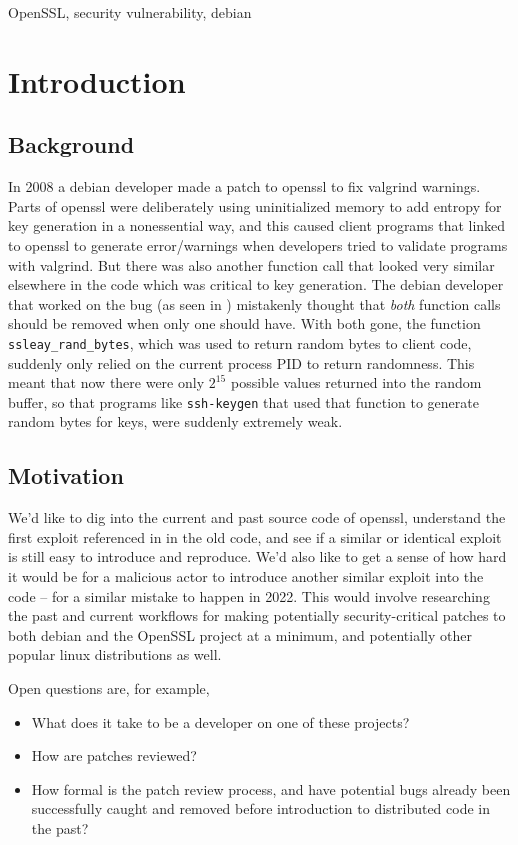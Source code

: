 \documentclass[conference]{IEEEtran}
\begin{document}
\begin{IEEEkeywords}
OpenSSL, security vulnerability, debian
\end{IEEEkeywords}

\section{Introduction}
\subsection{Background}
In 2008 a debian developer made a patch to openssl to fix valgrind
warnings\cite{2}\cite{3}. Parts of openssl were deliberately using
uninitialized memory to add entropy for key generation in a
nonessential way, and this caused client programs that linked to
openssl to generate error/warnings when developers tried to validate
programs with valgrind. But there was also another function call that
looked very similar elsewhere in the code which was critical to key
generation. The debian developer that worked on the bug (as seen in
\cite{2}) mistakenly thought that \emph{both} function calls should be
removed when only one should have. With both gone, the function
\verb|ssleay_rand_bytes|, which was used to return random bytes to
client code, suddenly only relied on the current process PID to return
randomness. This meant that now there were only $2^{15}$ possible
values returned into the random buffer, so that programs like
\verb|ssh-keygen| that used that function to generate random bytes for
keys, were suddenly extremely weak.

\subsection{Motivation}
We'd like to dig into the current and past source code of openssl,
understand the first exploit referenced in \cite{1} in the old code,
and see if a similar or identical exploit is still easy to introduce
and reproduce. We'd also like to get a sense of how hard it would be
for a malicious actor to introduce another similar exploit into the
code -- for a similar mistake to happen in 2022. This would involve
researching the past and current workflows for making potentially
security-critical patches to both debian and the OpenSSL project at a
minimum, and potentially other popular linux distributions as well.

Open questions are, for example,

\begin{itemize}
\item What does it take to be a developer on one of these projects?
\item How are patches reviewed?
\item How formal is the patch review process, and have potential bugs
  already been successfully caught and removed before introduction to
  distributed code in the past?
\end{itemize}
\end{document}
